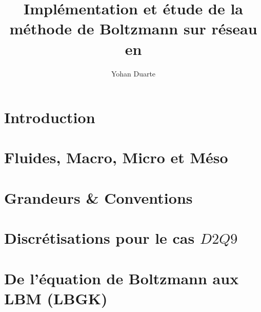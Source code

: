 \documentclass[unnumsec,webpdf,contemporary,large]{oup-authoring-template}%
\theoremstyle{thmstyleone}%
\theoremstyle{thmstyletwo}%
\theoremstyle{thmstylethree}%
\begin{document}



\title[LBM]{Implémentation et étude de la méthode de Boltzmann sur réseau en }

\author[1,$\ast$]{\hypertarget{authors}{Yohan Duarte}}


\address[1]{Étudiant en M1 PFA à Sorbonne Universitée, aka \href{https://github.com/Pacidus}{Pacidus}}


\abstract{}


\maketitle

  \section{Introduction} \label{seq:intro}
    
  
  \section{Fluides, Macro, Micro et Méso} \label{seq:3M}
    
  
  \section{Grandeurs \& Conventions} \label{seq:GC}
    
  
  \section{Discrétisations pour le cas $D2Q9$} \label{seq:DiscD2Q9}
    
   
  \section{De l'équation de Boltzmann aux LBM (LBGK)}\label{seq:DiscB}
    
  
\end{document}
